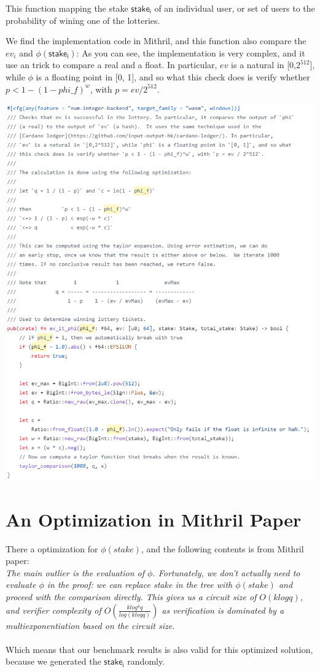 \documentclass{article}
\begin{document}
This function mapping the stake $\mathsf{stake_i}$ of an individual user, or set of users to the probability of wining one of the lotteries. 

We find the implementation code in Mithril, and this function also compare the $ev_i$ and $\phi(\mathsf{stake_i})$:
As you can see, the implementation is very complex, and it use an trick to compare a real and a float.
In particular, $ev$ is a natural in [0,$2^{512}$], while $\phi$ is a floating point in [0, 1], and so what this check does is verify whether $p < 1 - (1 - phi\_f)^w$, with $p = ev / 2^{512}$.

\includegraphics[width=0.9\linewidth]{mithril-ev_lt_phi-code.png}




\section{An Optimization in Mithril Paper}


There a optimization for $\phi(stake)$, and the following contents is from Mithril paper:
\\

\textit{The main outlier is the evaluation of $\phi$. Fortunately, we don’t actually need to evaluate $\phi$ in the proof: we can replace stake in the tree with $\phi(stake)$ and proceed with the comparison directly. This gives us a circuit size of $O(klogq)$, and verifier complexity of $O(\frac{klog^4q}{log(klogq)})$ as verification is dominated by a multiexponentiation based on the circuit size.}\\
\\
Which means that our benchmark results is also valid for this optimized solution, because we generated the $\mathsf{stake_i}$ randomly.
\end{document}
